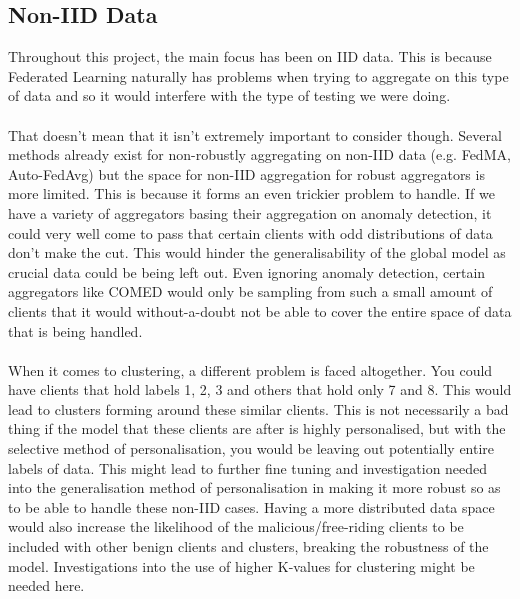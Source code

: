 \subsection{Non-IID Data}
Throughout this project, the main focus has been on IID data.
This is because Federated Learning naturally has problems when trying to aggregate on this type of data and so it would interfere with the type of testing we were doing.
\\ \\
That doesn't mean that it isn't extremely important to consider though.
Several methods already exist for non-robustly aggregating on non-IID data (e.g. FedMA, Auto-FedAvg) but the space for non-IID aggregation for robust aggregators is more limited.
This is because it forms an even trickier problem to handle.
If we have a variety of aggregators basing their aggregation on anomaly detection, it could very well come to pass that certain clients with odd distributions of data don't make the cut.
This would hinder the generalisability of the global model as crucial data could be being left out.
Even ignoring anomaly detection, certain aggregators like COMED would only be sampling from such a small amount of clients that it would without-a-doubt not be able to cover the entire space of data that is being handled.
\\ \\
When it comes to clustering, a different problem is faced altogether.
You could have clients that hold labels 1, 2, 3 and others that hold only 7 and 8.
This would lead to clusters forming around these similar clients.
This is not necessarily a bad thing if the model that these clients are after is highly personalised, but with the selective method of personalisation, you would be leaving out potentially entire labels of data.
This might lead to further fine tuning and investigation needed into the generalisation method of personalisation in making it more robust so as to be able to handle these non-IID cases.
Having a more distributed data space would also increase the likelihood of the malicious/free-riding clients to be included with other benign clients and clusters, breaking the robustness of the model.
Investigations into the use of higher K-values for clustering might be needed here.


